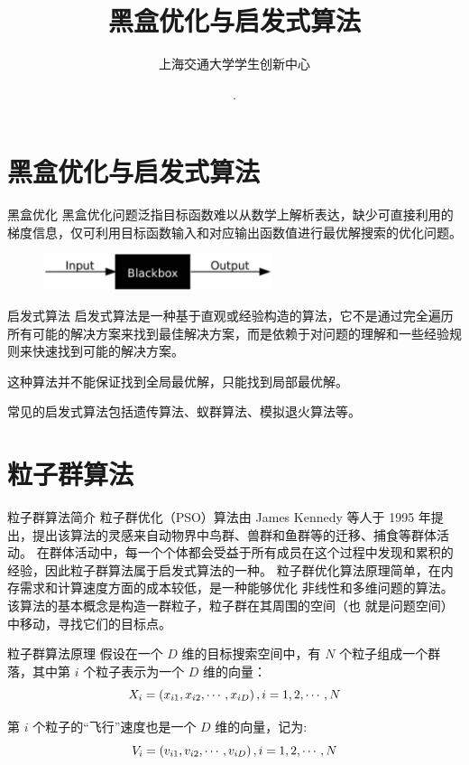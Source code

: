 \documentclass[xcolor=table,dvipsnames,svgnames,aspectratio=169,fontset=ubuntu]{ctexbeamer}
\author{上海交通大学学生创新中心}
\date{\the\year \,.\the\month \,}
\title[流形上的Soblev不等式与嵌入]
{\textnormal{黑盒优化与启发式算法}}
\let\quad\relax
\begin{document}
\maketitle
\section{黑盒优化与启发式算法}
\begin{frame}{黑盒优化}
  黑盒优化问题泛指目标函数难以从数学上解析表达，缺少可直接利用的梯度信息，仅可利用目标函数输入和对应输出函数值进行最优解搜索的优化问题。
  \vskip 20pt
  \begin{figure}
    \centering
    \includegraphics[width=0.6\textwidth]{黑盒优化.png}
  \end{figure}
\end{frame}

\begin{frame}{启发式算法}
  启发式算法是一种基于直观或经验构造的算法，它不是通过完全遍历所有可能的解决方案来找到最佳解决方案，而是依赖于对问题的理解和一些经验规则来快速找到可能的解决方案。
  
  \vskip 20pt
  这种算法并不能保证找到全局最优解，只能找到局部最优解。

  \vskip 20pt
  常见的启发式算法包括遗传算法、蚁群算法、模拟退火算法等。
\end{frame}



\section{粒子群算法}
\begin{frame}{粒子群算法简介}
  粒子群优化（PSO）算法由 James Kennedy 等人于 1995
年提出，提出该算法的灵感来自动物界中鸟群、兽群和鱼群等的迁移、捕食等群体活动。
在群体活动中，每一个个体都会受益于所有成员在这个过程中发现和累积的经验，因此粒子群算法属于启发式算法的一种。
\vskip 10pt
粒子群优化算法原理简单，在内存需求和计算速度方面的成本较低，是一种能够优化
非线性和多维问题的算法。该算法的基本概念是构造一群粒子，粒子群在其周围的空间（也
就是问题空间）中移动，寻找它们的目标点。

\end{frame}

\begin{frame}{粒子群算法原理}
  假设在一个 $D$ 维的目标搜索空间中，有 $N$ 个粒子组成一个群落，其中第 $i$ 个粒子表示为一个 $D$ 维的向量：
$$
X_i=\left(x_{i 1}, x_{i 2}, \cdots, x_{i D}\right), \quad i=1,2, \cdots, N
$$

第 $i$ 个粒子的“飞行”速度也是一个 $D$ 维的向量，记为:
$$
V_i=\left(v_{i 1}, v_{i 2}, \cdots, v_{i D}\right), \quad i=1,2, \cdots, N
$$
\end{frame}
\end{document}
